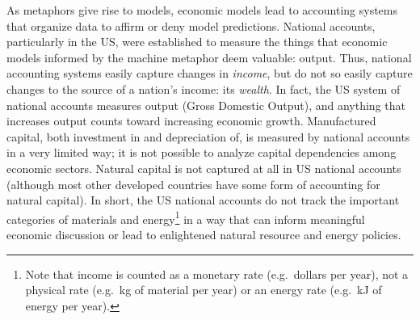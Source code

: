 As metaphors give rise to models, 
economic models lead to accounting systems that organize data
to affirm or deny model predictions.
National accounts, particularly in the US, 
were established to measure the things that 
economic models informed by the machine metaphor deem valuable: output. 
Thus, national accounting systems easily capture changes in \emph{income}, 
but do not so easily capture changes to the source 
of a nation's income: its \emph{wealth}.
In fact, the US system of national accounts measures output (Gross Domestic Output), 
and anything that increases output 
counts toward increasing economic growth. 
Manufactured capital, both investment in and depreciation of, 
is measured by national accounts in a very limited way;
it is not possible to analyze capital dependencies 
among economic sectors.\cite{Streitwieser:2011aa}
Natural capital is not captured at all in US national accounts (although
most other developed countries have some form of accounting for natural capital). 
In short, the US national accounts do not track the important categories 
of materials and energy\footnote{Note that
	income is counted as a monetary rate (e.g.\ dollars per year), 
	not a physical rate (e.g.\ kg of material per year)
	or an energy rate (e.g.\ kJ of energy per year).
	} 
in a way that can inform meaningful economic discussion or
lead to enlightened natural resource and energy policies.

